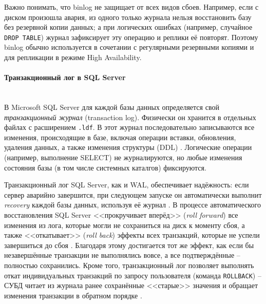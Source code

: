  Важно понимать, что binlog не защищает от всех видов сбоев. Например, если с диском произошла авария, из одного только журнала нельзя восстановить базу без резервной копии данных; а при логических ошибках (например, случайное \texttt{DROP TABLE}) журнал зафиксирует эту операцию и реплики её повторят. Поэтому binlog обычно используется в сочетании с регулярными резервными копиями и для репликации в режиме High Availability.

 \paragraph{Транзакционный лог в SQL Server} ~\\

 В Microsoft SQL Server для каждой базы данных определяется свой \textit{транзакционный журнал} (transaction log). Физически он хранится в отдельных файлах с расширением \texttt{.ldf}. В этот журнал последовательно записываются все изменения, происходящие в базе, включая операции вставки, обновления, удаления данных, а также изменения структуры (DDL) \autocite{MicrosoftLearnSQLserverTransLog}. Логические операции (например, выполнение SELECT) не журналируются, но любые изменения состояния базы (в том числе системных каталгов) фиксируются. 
 
 Транзакционный лог SQL Server, как и WAL, обеспечивает надёжность: если сервер аварийно завершится, при следующем запуске он автоматически выполнит \textit{recovery} каждой базы данных, используя её журнал \autocite{MicrosoftLearnSQLserverTransLog}. В процессе автоматического восстановления SQL Server <<прокручивает вперёд>> (\textit{roll forward}) все изменения из лога, которые могли не сохраниться на диск к моменту сбоя, а также <<откатывает>> (\textit{roll back}) эффекты всех транзакций, которые не успели завершиться до сбоя \autocite{MicrosoftLearnSQLserverTransLog}. Благодаря этому достигается тот же эффект, как если бы незавершённые транзакции не выполнялись вовсе, а все подтверждённые – полностью сохранились. Кроме того, транзакционный лог позволяет выполнять откат индивидуальных транзакций по запросу пользователя (команда \texttt{ROLLBACK}) – СУБД читает из журнала ранее сохранённые <<старые>> значения и обращает изменения транзакции в обратном порядке \autocite{MicrosoftLearnSQLserverTransLog}. 
 
